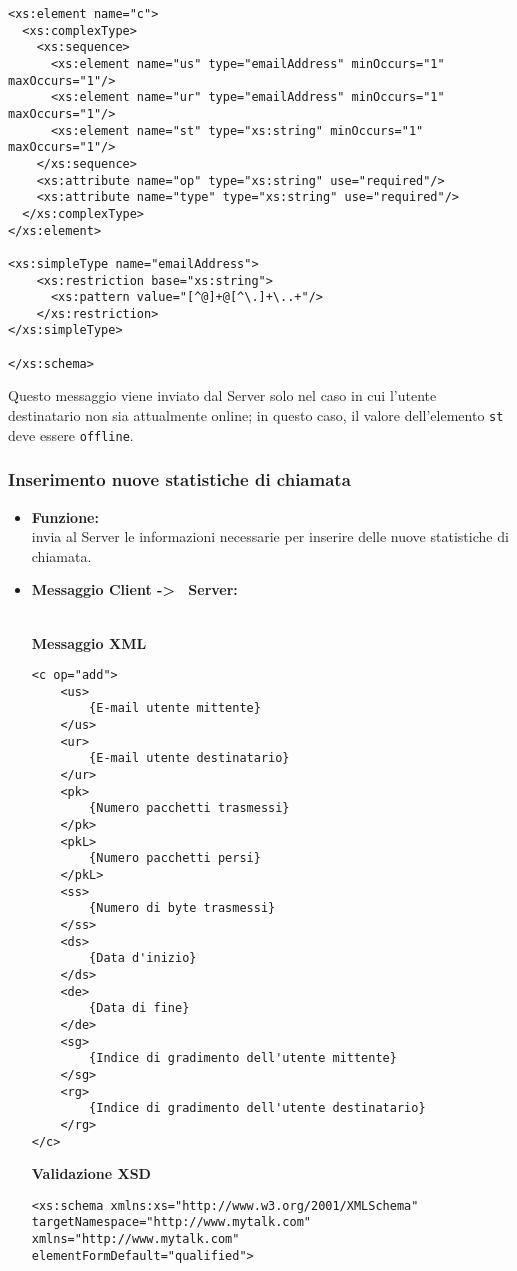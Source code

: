 {{\begin{itemize}
{\begin{lstlisting}
<xs:element name="c">
  <xs:complexType>
    <xs:sequence>
      <xs:element name="us" type="emailAddress" minOccurs="1" maxOccurs="1"/>
      <xs:element name="ur" type="emailAddress" minOccurs="1" maxOccurs="1"/>
      <xs:element name="st" type="xs:string" minOccurs="1" maxOccurs="1"/>
    </xs:sequence>
    <xs:attribute name="op" type="xs:string" use="required"/>
    <xs:attribute name="type" type="xs:string" use="required"/>
  </xs:complexType>
</xs:element>

<xs:simpleType name="emailAddress"> 
    <xs:restriction base="xs:string"> 
      <xs:pattern value="[^@]+@[^\.]+\..+"/> 
    </xs:restriction> 
</xs:simpleType> 

</xs:schema>
				\end{lstlisting}
				Questo messaggio viene inviato dal Server solo nel caso in cui l'utente destinatario non sia attualmente online; in questo caso, il valore dell'elemento \texttt{st} deve essere \texttt{offline}.
				}
		\end{itemize}
	}%
	
	
	
	
	\subsubsection{Inserimento nuove statistiche di chiamata}{
	\label{opCInsStat}
		\begin{itemize}
			\item[] \textbf{Funzione:}{\\
				invia al Server le informazioni necessarie per inserire delle nuove statistiche di chiamata.
				}
			
			\item[] \textbf{Messaggio Client -\textgreater~ Server:}{\\
			\textbf{Messaggio XML}\\
				\begin{lstlisting}
<c op="add">
	<us>
		{E-mail utente mittente}
	</us>
	<ur>
		{E-mail utente destinatario}
	</ur>
	<pk>
		{Numero pacchetti trasmessi}
	</pk>
	<pkL>
		{Numero pacchetti persi}
	</pkL>
	<ss>
		{Numero di byte trasmessi}
	</ss>
	<ds>
		{Data d'inizio}
	</ds>
	<de>
		{Data di fine}
	</de>
	<sg>
		{Indice di gradimento dell'utente mittente}
	</sg>
	<rg>
		{Indice di gradimento dell'utente destinatario}
	</rg>
</c>
				\end{lstlisting}
				\textbf{Validazione XSD}\\
				\begin{lstlisting}
<xs:schema xmlns:xs="http://www.w3.org/2001/XMLSchema"
targetNamespace="http://www.mytalk.com"
xmlns="http://www.mytalk.com"
elementFormDefault="qualified">


\end{lstlisting}}
\end{itemize}}}
